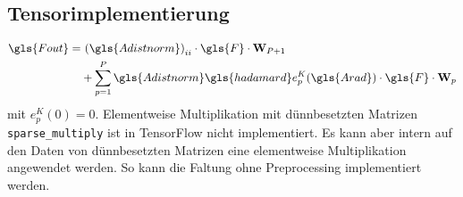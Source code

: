 \subsection{Tensorimplementierung}

\begin{equation}
\begin{split}
  \gls{Fout} = & \ {\left(\gls{Adistnorm}\right)}_{ii} \cdot \gls{F} \cdot \ma{W}_{P+1}\\
  & + \sum_{p=1}^P \gls{Adistnorm} \gls{hadamard} e^K_p\left(\gls{Arad}\right) \cdot \gls{F} \cdot \ma{W}_{p}
\end{split}
\end{equation}
mit $e_p^K(0) = 0$.
Elementweise Multiplikation mit dünnbesetzten Matrizen \texttt{sparse\_multiply} ist in TensorFlow nicht implementiert.
Es kann aber intern auf den Daten von dünnbesetzten Matrizen eine elementweise Multiplikation angewendet werden.
So kann die Faltung ohne Preprocessing implementiert werden.


\newpage
